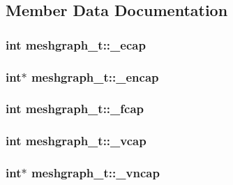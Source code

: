 \subsection{Member Data Documentation}
\hypertarget{structmeshgraph__t_abd55445fb633d3df6cf0850531ab795e}{
\subsubsection[{\_\-ecap}]{\setlength{\rightskip}{0pt plus 5cm}int {\bf meshgraph\_\-t::\_\-ecap}}}
\label{structmeshgraph__t_abd55445fb633d3df6cf0850531ab795e}
\hypertarget{structmeshgraph__t_a83379b06ad195ba450afab680123d2d1}{
\subsubsection[{\_\-encap}]{\setlength{\rightskip}{0pt plus 5cm}int$\ast$ {\bf meshgraph\_\-t::\_\-encap}}}
\label{structmeshgraph__t_a83379b06ad195ba450afab680123d2d1}
\hypertarget{structmeshgraph__t_ad99ab4117861414c0ecbb0ec184a5583}{
\subsubsection[{\_\-fcap}]{\setlength{\rightskip}{0pt plus 5cm}int {\bf meshgraph\_\-t::\_\-fcap}}}
\label{structmeshgraph__t_ad99ab4117861414c0ecbb0ec184a5583}
\hypertarget{structmeshgraph__t_a53989e19be0be5ff3e487f944f59b9fb}{
\subsubsection[{\_\-vcap}]{\setlength{\rightskip}{0pt plus 5cm}int {\bf meshgraph\_\-t::\_\-vcap}}}
\label{structmeshgraph__t_a53989e19be0be5ff3e487f944f59b9fb}
\hypertarget{structmeshgraph__t_a6a88c0b7244de6d5df3540c36af2f58b}{
\subsubsection[{\_\-vncap}]{\setlength{\rightskip}{0pt plus 5cm}int$\ast$ {\bf meshgraph\_\-t::\_\-vncap}}}
